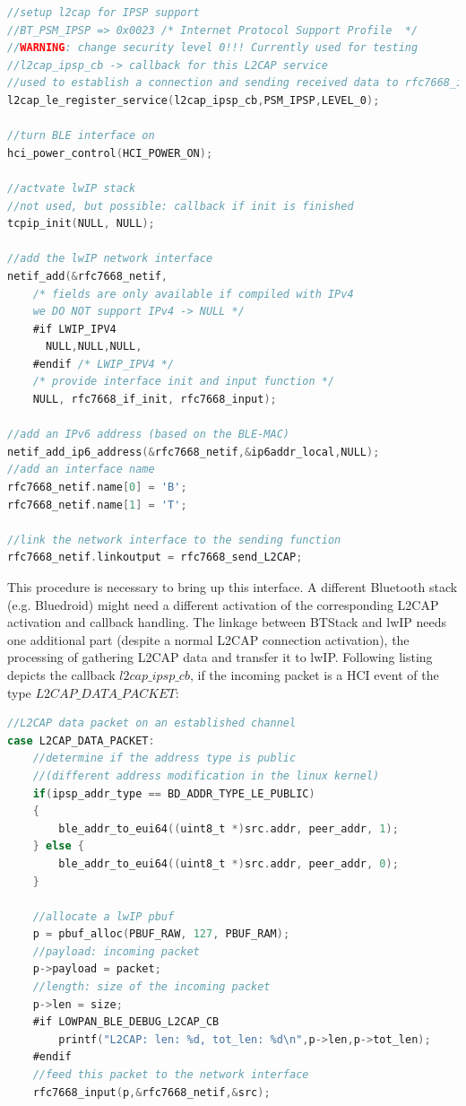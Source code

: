 \documentclass[]{scrreprt}%
\begin{document}
\begin{lstlisting}[frame=single,language=C,basicstyle=\footnotesize] 
//setup l2cap for IPSP support
//BT_PSM_IPSP => 0x0023 /* Internet Protocol Support Profile  */
//WARNING: change security level 0!!! Currently used for testing
//l2cap_ipsp_cb -> callback for this L2CAP service
//used to establish a connection and sending received data to rfc7668_input
l2cap_le_register_service(l2cap_ipsp_cb,PSM_IPSP,LEVEL_0);

//turn BLE interface on
hci_power_control(HCI_POWER_ON);

//actvate lwIP stack
//not used, but possible: callback if init is finished
tcpip_init(NULL, NULL); 

//add the lwIP network interface
netif_add(&rfc7668_netif, 
    /* fields are only available if compiled with IPv4
    we DO NOT support IPv4 -> NULL */
    #if LWIP_IPV4
      NULL,NULL,NULL,
    #endif /* LWIP_IPV4 */
    /* provide interface init and input function */
    NULL, rfc7668_if_init, rfc7668_input);

//add an IPv6 address (based on the BLE-MAC)
netif_add_ip6_address(&rfc7668_netif,&ip6addr_local,NULL);
//add an interface name
rfc7668_netif.name[0] = 'B';
rfc7668_netif.name[1] = 'T';

//link the network interface to the sending function
rfc7668_netif.linkoutput = rfc7668_send_L2CAP;
\end{lstlisting}

This procedure is necessary to bring up this interface.
A different Bluetooth stack (e.g. Bluedroid) might need a different activation of the corresponding L2CAP activation and callback handling.
The linkage between BTStack and lwIP needs one additional part (despite a normal L2CAP connection activation), the processing of gathering L2CAP data
and transfer it to lwIP. Following listing depicts the callback \textit{$l2cap\_ipsp\_cb$}, if the incoming packet is a HCI event of the type \textit{$L2CAP\_DATA\_PACKET$}:

\begin{lstlisting}[frame=single,language=C,basicstyle=\footnotesize] 
//L2CAP data packet on an established channel
case L2CAP_DATA_PACKET:	
	//determine if the address type is public
	//(different address modification in the linux kernel)
	if(ipsp_addr_type == BD_ADDR_TYPE_LE_PUBLIC)
	{
		ble_addr_to_eui64((uint8_t *)src.addr, peer_addr, 1);
	} else {
		ble_addr_to_eui64((uint8_t *)src.addr, peer_addr, 0);
	}
	
	//allocate a lwIP pbuf
	p = pbuf_alloc(PBUF_RAW, 127, PBUF_RAM);
	//payload: incoming packet
	p->payload = packet;
	//length: size of the incoming packet
	p->len = size;
	#if LOWPAN_BLE_DEBUG_L2CAP_CB
		printf("L2CAP: len: %d, tot_len: %d\n",p->len,p->tot_len);
	#endif
	//feed this packet to the network interface
	rfc7668_input(p,&rfc7668_netif,&src);
\end{lstlisting}
\end{document}
